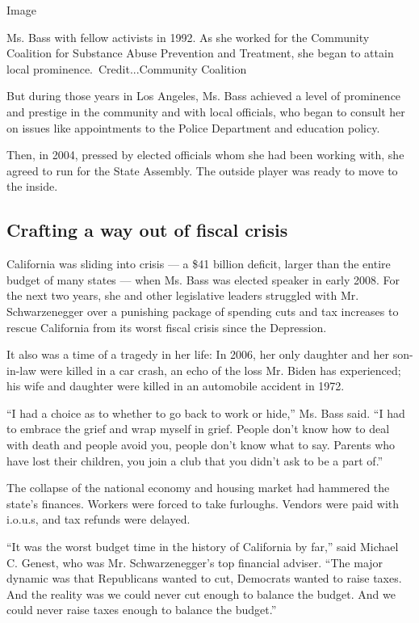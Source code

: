 Image

Ms. Bass with fellow activists in 1992. As she worked for the Community
Coalition for Substance Abuse Prevention and Treatment, she began to
attain local prominence.~Credit...Community Coalition

But during those years in Los Angeles, Ms. Bass achieved a level of
prominence and prestige in the community and with local officials, who
began to consult her on issues like appointments to the Police
Department and education policy.

Then, in 2004, pressed by elected officials whom she had been working
with, she agreed to run for the State Assembly. The outside player was
ready to move to the inside.

\hypertarget{crafting-a-way-out-of-fiscal-crisis}{%
\subsection{Crafting a way out of fiscal
crisis}\label{crafting-a-way-out-of-fiscal-crisis}}

California was sliding into crisis --- a \$41 billion deficit, larger
than the entire budget of many states --- when Ms. Bass was elected
speaker in early 2008. For the next two years, she and other legislative
leaders struggled with Mr. Schwarzenegger over a punishing package of
spending cuts and tax increases to rescue California from its worst
fiscal crisis since the Depression.

It also was a time of a tragedy in her life: In 2006, her only daughter
and her son-in-law were killed in a car crash, an echo of the loss Mr.
Biden has experienced; his wife and daughter were killed in an
automobile accident in 1972.

``I had a choice as to whether to go back to work or hide,'' Ms. Bass
said. ``I had to embrace the grief and wrap myself in grief. People
don't know how to deal with death and people avoid you, people don't
know what to say. Parents who have lost their children, you join a club
that you didn't ask to be a part of.''

The collapse of the national economy and housing market had hammered the
state's finances. Workers were forced to take furloughs. Vendors were
paid with i.o.u.s, and tax refunds were delayed.

``It was the worst budget time in the history of California by far,''
said Michael C. Genest, who was Mr. Schwarzenegger's top financial
adviser. ``The major dynamic was that Republicans wanted to cut,
Democrats wanted to raise taxes. And the reality was we could never cut
enough to balance the budget. And we could never raise taxes enough to
balance the budget.''

